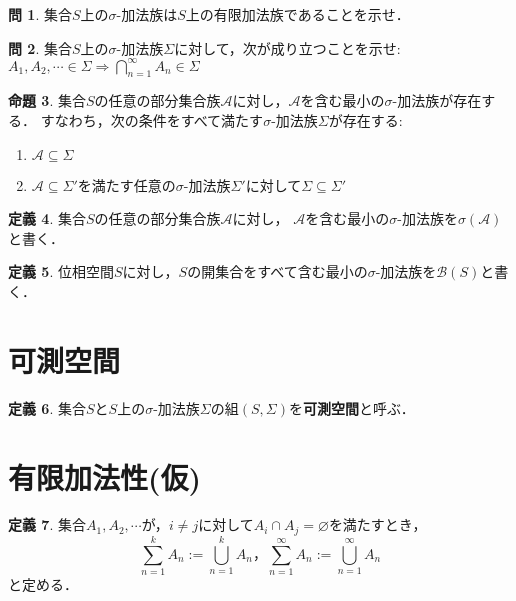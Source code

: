 \documentclass{jsreport}
\theoremstyle{definition}
\newtheorem{defi}{定義}[section]
\newtheorem{prop}[defi]{命題}
\newtheorem{qst}[defi]{問}
\begin{document}
\begin{qst}\label{qst_sigma_algebra_is_algebra}
集合$S$上の$\sigma$-加法族は$S$上の有限加法族であることを示せ．
\end{qst}

\begin{qst}\label{qst_countable_intersection}
集合$S$上の$\sigma$-加法族$\Sigma$に対して，次が成り立つことを示せ:
$A_1,A_2,\cdots\in\Sigma \Rightarrow \displaystyle \bigcap_{n=1}^\infty A_n\in\Sigma$
\end{qst}

\begin{prop}\label{prop_minimal_sigma_algebra}
集合$S$の任意の部分集合族$\mathcal{A}$に対し，$\mathcal{A}$を含む最小の$\sigma$-加法族が存在する．
すなわち，次の条件をすべて満たす$\sigma$-加法族$\Sigma$が存在する:
\begin{enumerate}
\item$\mathcal{A}\subseteq\Sigma$
\item$\mathcal{A}\subseteq\Sigma'$を満たす任意の$\sigma$-加法族$\Sigma'$に対して$\Sigma\subseteq\Sigma'$
\end{enumerate}
\end{prop}

\begin{defi}\label{def_minimal_sigma_algebra}
集合$S$の任意の部分集合族$\mathcal{A}$に対し，
$\mathcal{A}$を含む最小の$\sigma$-加法族を$\sigma(\mathcal{A})$と書く．
\end{defi}

\begin{defi}\label{def_Borel_set}
位相空間$S$に対し，$S$の開集合をすべて含む最小の$\sigma$-加法族を$\mathcal{B}(S)$と書く．
\end{defi}

\section{可測空間}

\begin{defi}\label{def_measurable_space}
集合$S$と$S$上の$\sigma$-加法族$\Sigma$の組$(S,\Sigma)$を\textbf{可測空間}と呼ぶ．
\end{defi}

\section{有限加法性(仮)}

\begin{defi}\label{def_disjoint_union}
集合$A_1,A_2,\cdots$が，$i \neq j$に対して$A_i \cap A_j=\varnothing$を満たすとき，
\[ \sum_{n=1}^k A_n:=\bigcup_{n=1}^k A_n，\sum_{n=1}^\infty A_n:=\bigcup_{n=1}^\infty A_n \]
と定める．
\end{defi}
\end{document}
